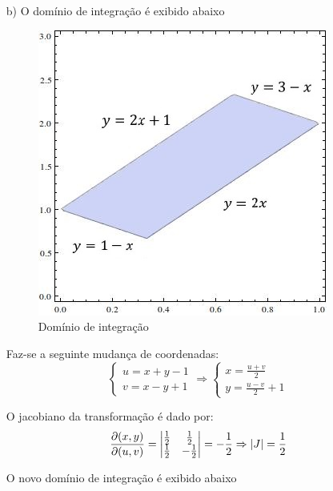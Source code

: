 \documentclass[12pt,a4paper]{article}
\begin{document}
\begin{itemize}
\item[b)] O domínio de integração é exibido abaixo

\begin{figure}[H]
	\centering
	\includegraphics[scale=0.4]{Q1bA.jpg}  
	\caption{Domínio de integração}
	\label{fig:figura2}
\end{figure}    
Faz-se a seguinte mudança de coordenadas:
$$\begin{cases}
u = x+y-1\\
v = x-y+1
\end{cases}
\Rightarrow
\begin{cases}
x = \frac{u+v}{2}\\
y = \frac{u-v}{2}+1
\end{cases}
$$

O jacobiano da transformação é dado por:
$$
\frac{\partial(x,y)}{\partial(u,v)}=
\begin{vmatrix}
\frac{1}{2} & \frac{1}{2} \\
\frac{1}{2} & -\frac{1}{2}\\
\end{vmatrix}
=-\frac{1}{2} \Rightarrow |J|=\frac{1}{2}\\
$$  

O novo domínio de integração é exibido abaixo


\end{itemize}
\end{document}
